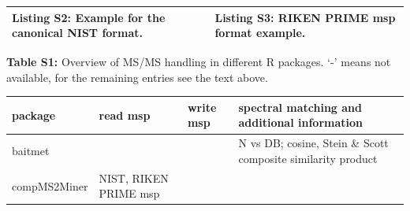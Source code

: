 \documentclass[]{article}
\begin{document}
\begin{tabular}{>{\raggedright\arraybackslash}p{22em}|>{\raggedright\arraybackslash}p{22em}}
\hline
\rowcolor{white}  {\bf Listing S2:} Example for the canonical NIST format. & {\bf Listing S3:} RIKEN PRIME msp format example.\\
\bottomrule
\end{tabular}

\leavevmode\newline\leavevmode\newline\leavevmode\newline\leavevmode\newline
\newpage

\textbf{Table S1:} Overview of MS/MS handling in different R packages. `-' means not available, for the remaining entries see the text above.

\begin{longtable}[]{@{}llll@{}}
\toprule
\begin{minipage}[b]{0.09\columnwidth}\raggedright
package\strut
\end{minipage} & \begin{minipage}[b]{0.17\columnwidth}\raggedright
read msp\strut
\end{minipage} & \begin{minipage}[b]{0.17\columnwidth}\raggedright
write msp\strut
\end{minipage} & \begin{minipage}[b]{0.46\columnwidth}\raggedright
spectral matching and additional information\strut
\end{minipage}\tabularnewline
\midrule
\endhead
\begin{minipage}[t]{0.09\columnwidth}\raggedright
baitmet\strut
\end{minipage} & \begin{minipage}[t]{0.17\columnwidth}\raggedright
\strut
\end{minipage} & \begin{minipage}[t]{0.17\columnwidth}\raggedright
\strut
\end{minipage} & \begin{minipage}[t]{0.46\columnwidth}\raggedright
N vs DB; cosine, Stein \& Scott composite similarity product\strut
\end{minipage}\tabularnewline
\begin{minipage}[t]{0.09\columnwidth}\raggedright
compMS2Miner\strut
\end{minipage} & \begin{minipage}[t]{0.17\columnwidth}\raggedright
NIST, RIKEN PRIME msp\strut
\end{minipage} & \begin{minipage}[t]{0.17\columnwidth}\raggedright

\end{minipage}
\end{longtable}
\end{document}
